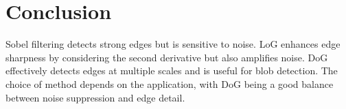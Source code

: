 \documentclass{report}
\begin{document}
\section{Conclusion}
Sobel filtering detects strong edges but is sensitive to noise. LoG enhances edge sharpness by considering the second derivative but also amplifies noise. DoG effectively detects edges at multiple scales and is useful for blob detection. The choice of method depends on the application, with DoG being a good balance between noise suppression and edge detail.
\end{document}
